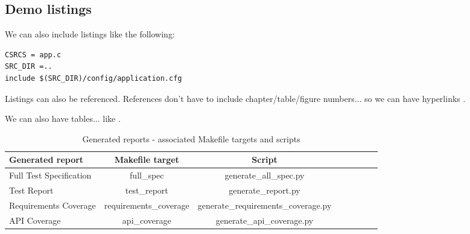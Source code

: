\subsection{Demo listings}

We can also include listings like the following:

\lstset{language=make,caption=Application Makefile,label=lst:app-make}
\begin{lstlisting}
CSRCS = app.c
SRC_DIR =..
include $(SRC_DIR)/config/application.cfg
\end{lstlisting}

Listings can also be referenced. References don't have to include chapter/table/figure numbers... so we can have hyperlinks .


We can also have tables... like .

\begin{center}
\begin{table}[htb]
  \caption{Generated reports - associated Makefile targets and scripts}
  \begin{tabular}{l*{6}{c}r}
    Generated report & Makefile target & Script \\
    \hline
    Full Test Specification & full_spec & generate_all_spec.py  \\
    Test Report & test_report & generate_report.py  \\
    Requirements Coverage & requirements_coverage &
    generate_requirements_coverage.py   \\
    API Coverage & api_coverage & generate_api_coverage.py  \\
  \end{tabular}
  \label{table:reports}
\end{table}
\end{center}